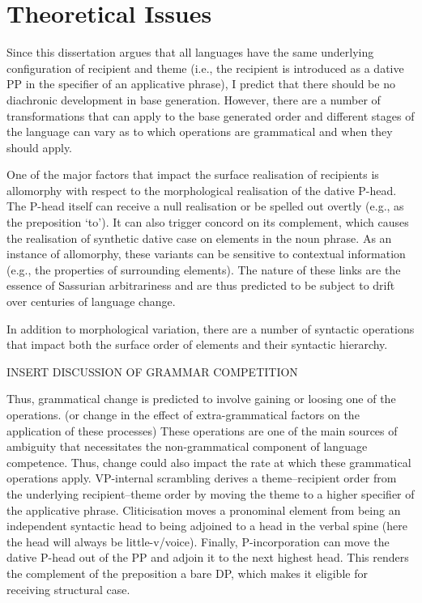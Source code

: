 \section{Theoretical Issues}
	Since this dissertation argues that all languages have the same underlying configuration of recipient and theme (i.e., the recipient is introduced as a dative PP in the specifier of an applicative phrase), I predict that there should be no diachronic development in base generation. However, there are a number of transformations that can apply to the base generated order and different stages of the language can vary as to which operations are grammatical and when they should apply.

	One of the major factors that impact the surface realisation of recipients is allomorphy with respect to the morphological realisation of the dative P-head. The P-head itself can receive a null realisation or be spelled out overtly (e.g., as the preposition `to'). It can also trigger concord on its complement, which causes the realisation of synthetic dative case on elements in the noun phrase. As an instance of allomorphy, these variants can be sensitive to contextual information (e.g., the properties of surrounding elements). The nature of these links are the essence of Sassurian arbitrariness and are thus predicted to be subject to drift over centuries of language change.

	In addition to morphological variation, there are a number of syntactic operations that impact both the surface order of elements and their syntactic hierarchy.
	
	INSERT DISCUSSION OF GRAMMAR COMPETITION
	
	Thus, grammatical change is predicted to involve gaining or loosing one of the operations. (or change in the effect of extra-grammatical factors on the application of these processes) These operations are one of the main sources of ambiguity that necessitates the non-grammatical component of language competence. Thus, change could also impact the rate at which these grammatical operations apply. VP-internal scrambling derives a theme--recipient order from the underlying recipient--theme order by moving the theme to a higher specifier of the applicative phrase. Cliticisation moves a pronominal element from being an independent syntactic head to being adjoined to a head in the verbal spine (here the head will always be little-v/voice). Finally, P-incorporation can move the dative P-head out of the PP and adjoin it to the next highest head. This renders the complement of the preposition a bare DP, which makes it eligible for receiving structural case.

